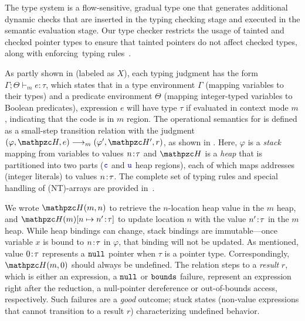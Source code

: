 The \lang type system is a flow-sensitive, gradual type one that generates additional dynamic checks that are inserted in the typing checking stage and executed in the semantic evaluation stage.
Our type checker restricts the usage of tainted and checked pointer types to ensure that tainted pointers do not affect checked types, along with enforcing~\checkedc typing rules~\cite{li22checkedc}.

As partly shown in  (labeled as $X$),
each typing judgment has the form $\Gamma;\Theta\vdash_m e : \tau$,
which states that in a type environment $\Gamma$ (mapping variables to
their types) and a predicate environment $\Theta$ (mapping integer-typed
variables to Boolean predicates), expression $e$ will have type $\tau$ if evaluated
in context mode $m$, indicating that the code is in $m$ region.
The operational semantics for \lang is defined as a small-step
transition relation with the judgment $ (\varphi,\heap,e)
\longrightarrow_m (\varphi',\heap',r)$, as shown in .
 Here, $\varphi$ is a
\emph{stack} mapping from variables to values ${n}\!:\!{\tau}$ and
$\heap$ is a \emph{heap} that is partitioned into two parts ($\textcolor{blue}{\texttt{c}}$ and $\textcolor{blue}{\texttt{u}}$ heap regions), each of which
maps addresses (integer literals) to values ${n}\!:\!{\tau}$.
The complete set of typing rules and special handling of (NT)-arrays are provided in~.

We wrote $\heap(m,n)$ to retrieve the $n$-location heap value in the $m$ heap,
and $\heapup{m}{n}{\evalue{n'}{\tau}}$ 
to update location $n$ with the value ${n'}\!:\!{\tau}$ in the $m$ heap.
While heap bindings can change, stack bindings are immutable---once
variable $x$ is bound to ${n}\!:\!{\tau}$ in $\varphi$, that binding will not
be updated. 
As mentioned, value ${0}\!:\!{\tau}$
represents a $\mathtt{null}$ pointer when $\tau$ is a pointer type.
Correspondingly, $\heap(m,0)$ should always be undefined.
% 
The relation steps to a \emph{result} $r$, which is either an
expression, a $\mathtt{null}$ or $\mathtt{bounds}$ failure, represent an expression right
  after the reduction, a null-pointer dereference or out-of-bounds access,
respectively.
% 
Such failures are a \emph{good} outcome; stuck states
(non-value expressions that cannot transition to a result $r$)
characterizing undefined behavior.


